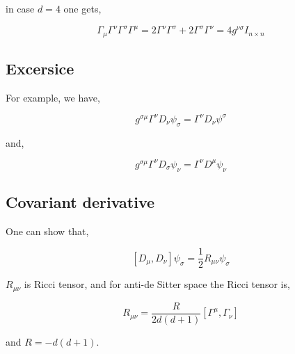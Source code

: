 in case $d = 4$ one gets,

\begin{equation}
   \Gamma_{\mu}\Gamma^{\nu}\Gamma^{\sigma}\Gamma^{\mu} = 2 \Gamma^{\nu}\Gamma^{\sigma} + 2\Gamma^{\sigma}\Gamma^{\nu} = 4 g^{\nu\sigma} I_{n \times n}
\end{equation}

\subsection{Excersice}

For example, we have,

\begin{equation}
   g^{\sigma\mu}\Gamma^{\nu}D_{\nu}\psi_{\sigma} = \Gamma^{\nu}D_{\nu}\psi^{\sigma}
\end{equation}

and,

\begin{equation}
   g^{\sigma\mu}\Gamma^{\nu}D_{\sigma}\psi_{\nu} = \Gamma^{\nu}D^{\mu}\psi_{\nu}
\end{equation}

\subsection{Covariant derivative}

One can show that,

\begin{equation}
   \left[D_{\mu},D_{\nu}\right] \psi_{\sigma} = \frac{1}{2} R_{\mu\nu}\psi_{\sigma}
\end{equation}

$R_{\mu\nu}$ is Ricci tensor, and for anti-de Sitter space the Ricci tensor is,

\begin{equation}
   R_{\mu\nu} = \frac{R}{2d(d+1)} \left[\Gamma^{\mu},\Gamma_{\nu}\right]
\end{equation}

and $R=-d(d+1)$.
